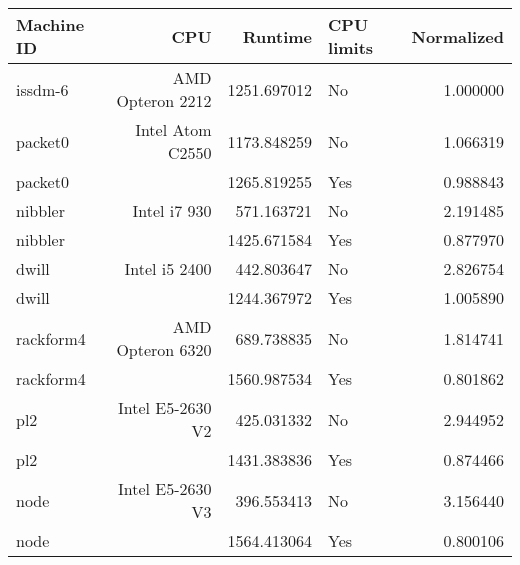 \begin{tabular}{lrrlr}
\toprule
Machine ID &               CPU &      Runtime & CPU limits &  Normalized \\
\midrule
   issdm-6 &  AMD Opteron 2212 &  1251.697012 &         No &    1.000000 \\
   packet0 &  Intel Atom C2550 &  1173.848259 &         No &    1.066319 \\
   packet0 &                   &  1265.819255 &        Yes &    0.988843 \\
   nibbler &      Intel i7 930 &   571.163721 &         No &    2.191485 \\
   nibbler &                   &  1425.671584 &        Yes &    0.877970 \\
     dwill &     Intel i5 2400 &   442.803647 &         No &    2.826754 \\
     dwill &                   &  1244.367972 &        Yes &    1.005890 \\
 rackform4 &  AMD Opteron 6320 &   689.738835 &         No &    1.814741 \\
 rackform4 &                   &  1560.987534 &        Yes &    0.801862 \\
       pl2 &  Intel E5-2630 V2 &   425.031332 &         No &    2.944952 \\
       pl2 &                   &  1431.383836 &        Yes &    0.874466 \\
      node &  Intel E5-2630 V3 &   396.553413 &         No &    3.156440 \\
      node &                   &  1564.413064 &        Yes &    0.800106 \\
\bottomrule
\end{tabular}
